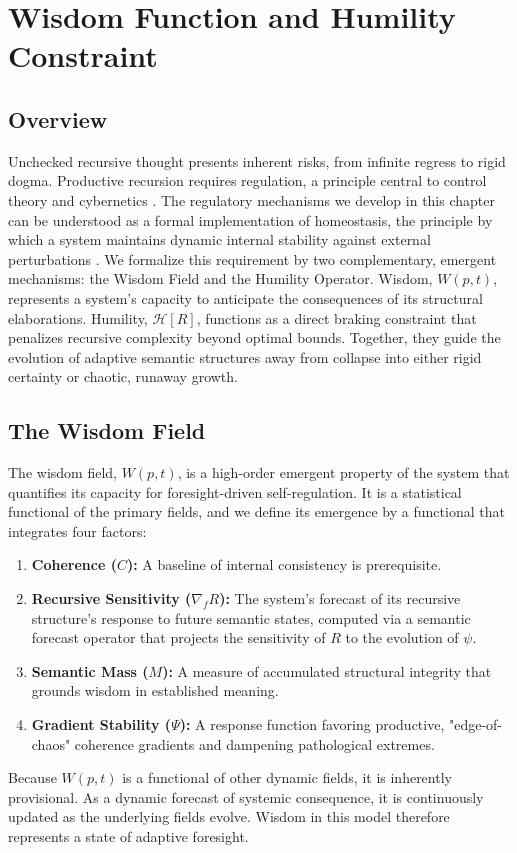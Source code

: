 \chapter{Wisdom Function and Humility Constraint}\label{ch:wisdom_humility}

\section{Overview}

Unchecked recursive thought presents inherent risks, from infinite regress to rigid dogma. Productive recursion requires regulation, a principle central to control theory and cybernetics \autocite{Kalman1960, AndersonMoore1990, Wiener1948, Ashby1952}. The regulatory mechanisms we develop in this chapter can be understood as a formal implementation of homeostasis, the principle by which a system maintains dynamic internal stability against external perturbations \autocite{Cannon1932}. We formalize this requirement by two complementary, emergent mechanisms: the Wisdom Field and the Humility Operator. Wisdom, \(W(p,t)\), represents a system's capacity to anticipate the consequences of its structural elaborations. Humility, \(\mathcal{H}[R]\), functions as a direct braking constraint that penalizes recursive complexity beyond optimal bounds. Together, they guide the evolution of adaptive semantic structures away from collapse into either rigid certainty or chaotic, runaway growth.

\section{The Wisdom Field}\label{sec:wisdom_field}

The wisdom field, \(W(p, t)\), is a high-order emergent property of the system that quantifies its capacity for foresight-driven self-regulation. It is a statistical functional of the primary fields, and we define its emergence by a functional that integrates four factors:
\begin{enumerate}
    \item \textbf{Coherence (\(C\)):} A baseline of internal consistency is prerequisite.
    \item \textbf{Recursive Sensitivity (\(\nabla_f R\)):} The system's forecast of its recursive structure's response to future semantic states, computed via a semantic forecast operator that projects the sensitivity of \(R\) to the evolution of \(\psi\).
    \item \textbf{Semantic Mass (\(M\)):} A measure of accumulated structural integrity that grounds wisdom in established meaning.
    \item \textbf{Gradient Stability (\(\Psi\)):} A response function favoring productive, "edge-of-chaos" coherence gradients and dampening pathological extremes.
\end{enumerate}
Because \(W(p,t)\) is a functional of other dynamic fields, it is inherently provisional. As a dynamic forecast of systemic consequence, it is continuously updated as the underlying fields evolve. Wisdom in this model therefore represents a state of adaptive foresight.

